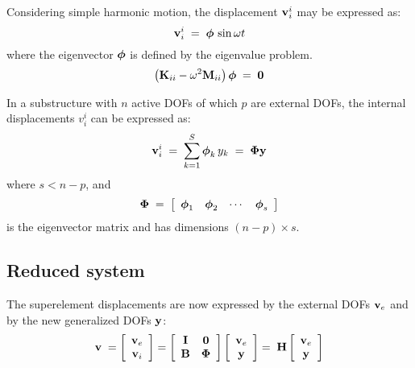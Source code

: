 Considering simple harmonic motion, the displacement ${\bf v}_i^i$ may be expressed as:
%
\begin{equation}
{\bf v}_i^i \;=\; {\boldsymbol{\phi}}\,\sin\omega t
\label{eqCMS:47}
\end{equation}
%
where the eigenvector ${\boldsymbol{\phi}}$ is defined by the eigenvalue problem.
%
\begin{equation}
\left({\bf K}_{ii} -\omega^2{\bf M}_{ii}\right) {\boldsymbol{\phi}} \;=\; {\bf 0}
\label{eqCMS:48}
\end{equation}

In a substructure with $n$ active DOFs of which $p$ are external DOFs,
the internal displacements $v_i^i$ can be expressed as:
%
\begin{equation}
{\bf v}_i^i \;=\; \sum_{k=1}^S {\boldsymbol{\phi}}_k \, y_k \;=\; {\boldsymbol{\Phi}}{\bf y}
\label{eqCMS:49}
\end{equation}
%
where $s<n-p$, and
%
\begin{equation}
{\boldsymbol{\Phi}} \;=\; \left[ \begin{array}{cccc}
{\boldsymbol{\phi}}_1 & {\boldsymbol{\phi}}_2 & \cdots & {\boldsymbol{\phi}}_s
\end{array}\right]
\end{equation}
%
is the eigenvector matrix and has dimensions $(n-p)\times s$.

\subsection{Reduced system}
\label{subsec:Reduced system}

The superelement displacements are now expressed by the external DOFs
${\bf v}_e$ and by the new generalized DOFs ${\bf y}$:
%
\begin{equation}
{\bf v} \;= \left[\begin{array}{c}
{\bf v}_e \\ {\bf v}_i
\end{array}\right] = \left[\begin{array}{cc}
{\bf I} & {\bf 0} \\
{\bf B} & {\boldsymbol{\Phi}}
\end{array}\right]
\left[\begin{array}{c}
{\bf v}_e \\ {\bf y}
\end{array}\right] =\; {\bf H} \left[\begin{array}{c}
{\bf v}_e \\ {\bf y}
\end{array}\right]
\label{eqCMS:Hdef}
\end{equation}


